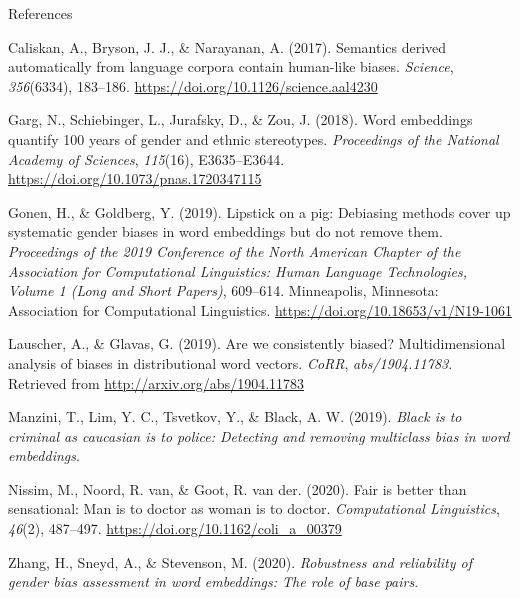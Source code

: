 \documentclass[10pt,ignorenonframetext,x11names, dvipsnames, bibspacing,natbib]{beamer}
\begin{document}
\begin{frame}{References}

\tiny

\hypertarget{refs}{}
\hypertarget{ref-Caliskan2017semanticsBiases}{}
Caliskan, A., Bryson, J. J., \& Narayanan, A. (2017). Semantics derived
automatically from language corpora contain human-like biases.
\emph{Science}, \emph{356}(6334), 183--186.
\url{https://doi.org/10.1126/science.aal4230}

\hypertarget{ref-Garg2018years}{}
Garg, N., Schiebinger, L., Jurafsky, D., \& Zou, J. (2018). Word
embeddings quantify 100 years of gender and ethnic stereotypes.
\emph{Proceedings of the National Academy of Sciences}, \emph{115}(16),
E3635--E3644. \url{https://doi.org/10.1073/pnas.1720347115}

\hypertarget{ref-Gonen2019lipstick}{}
Gonen, H., \& Goldberg, Y. (2019). Lipstick on a pig: Debiasing methods
cover up systematic gender biases in word embeddings but do not remove
them. \emph{Proceedings of the 2019 Conference of the North American
Chapter of the Association for Computational Linguistics: Human Language
Technologies, Volume 1 (Long and Short Papers)}, 609--614. Minneapolis,
Minnesota: Association for Computational Linguistics.
\url{https://doi.org/10.18653/v1/N19-1061}

\hypertarget{ref-Lauscher2019multidimensional}{}
Lauscher, A., \& Glavas, G. (2019). Are we consistently biased?
Multidimensional analysis of biases in distributional word vectors.
\emph{CoRR}, \emph{abs/1904.11783}. Retrieved from
\url{http://arxiv.org/abs/1904.11783}

\hypertarget{ref-Manzini2019blackToCriminal}{}
Manzini, T., Lim, Y. C., Tsvetkov, Y., \& Black, A. W. (2019).
\emph{Black is to criminal as caucasian is to police: Detecting and
removing multiclass bias in word embeddings}.

\hypertarget{ref-Nissim2020fair}{}
Nissim, M., Noord, R. van, \& Goot, R. van der. (2020). Fair is better
than sensational: Man is to doctor as woman is to doctor.
\emph{Computational Linguistics}, \emph{46}(2), 487--497.
\url{https://doi.org/10.1162/coli_a_00379}

\hypertarget{ref-zhang2020robustness}{}
Zhang, H., Sneyd, A., \& Stevenson, M. (2020). \emph{Robustness and
reliability of gender bias assessment in word embeddings: The role of
base pairs}.

\end{frame}
\end{document}
